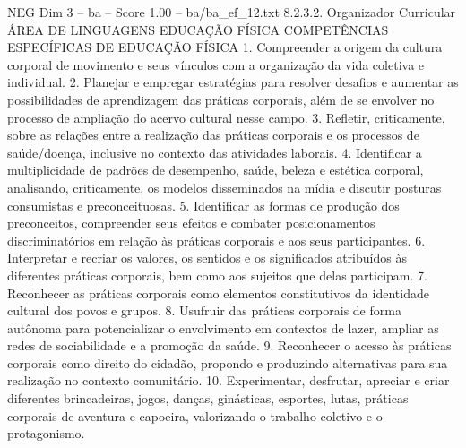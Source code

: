 \begin{textsample}{NEG Dim 3 – ba – Score 1.00 – ba/ba\_ef\_12.txt}  \label{ex:f3_neg_111}
8.2.3.2.
Organizador Curricular ÁREA DE LINGUAGENS EDUCAÇÃO FÍSICA COMPETÊNCIAS ESPECÍFICAS DE EDUCAÇÃO FÍSICA 1.
Compreender a origem da cultura corporal de movimento e seus vínculos com a organização da vida coletiva e individual. 2.
Planejar e empregar estratégias para resolver desafios e aumentar as possibilidades de aprendizagem das práticas corporais, além de se envolver no processo de ampliação do acervo cultural nesse campo. 3.
Refletir, criticamente, sobre as relações entre a realização das práticas corporais e os processos de saúde/doença, inclusive no contexto das atividades laborais. 4.
Identificar a multiplicidade de padrões de desempenho, saúde, beleza e estética corporal, analisando, criticamente, os modelos disseminados na mídia e discutir posturas consumistas e preconceituosas. 5.
Identificar as formas de produção dos preconceitos, compreender seus efeitos e combater posicionamentos discriminatórios em relação às práticas corporais e aos seus participantes. 6.
Interpretar e recriar os valores, os sentidos e os significados atribuídos às diferentes práticas corporais, bem como aos sujeitos que delas participam. 7.
Reconhecer as práticas corporais como elementos constitutivos da identidade cultural dos povos e grupos. 8.
Usufruir das práticas corporais de forma autônoma para potencializar o envolvimento em contextos de lazer, ampliar as redes de sociabilidade e a promoção da saúde. 9.
Reconhecer o acesso às práticas corporais como direito do cidadão, propondo e produzindo alternativas para sua realização no contexto comunitário. 10.
Experimentar, desfrutar, apreciar e criar diferentes brincadeiras, jogos, danças, ginásticas, esportes, lutas, práticas corporais de aventura e capoeira, valorizando o trabalho coletivo e o protagonismo.

\end{textsample}
